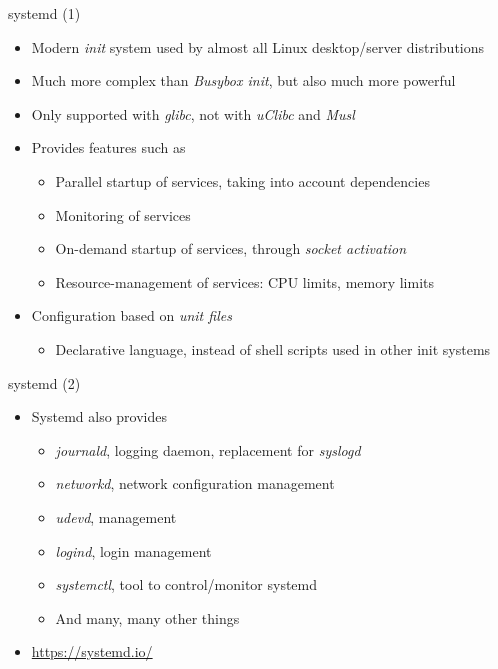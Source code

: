 \begin{frame}{systemd (1)}
  \begin{itemize}
  \item Modern {\em init} system used by almost all Linux
    desktop/server distributions
  \item Much more complex than {\em Busybox init}, but also much more
    powerful
  \item Only supported with {\em glibc}, not with {\em uClibc} and {\em Musl}
  \item Provides features such as
    \begin{itemize}
    \item Parallel startup of services, taking into account
      dependencies
    \item Monitoring of services
    \item On-demand startup of services, through {\em socket
        activation}
    \item Resource-management of services: CPU limits, memory limits
    \end{itemize}
  \item Configuration based on {\em unit files}
    \begin{itemize}
    \item Declarative language, instead of shell scripts used in other
      init systems
    \end{itemize}
  \end{itemize}
\end{frame}

\begin{frame}{systemd (2)}
  \begin{itemize}
  \item Systemd also provides
    \begin{itemize}
    \item {\em journald}, logging daemon, replacement for {\em syslogd}
    \item {\em networkd}, network configuration management
    \item {\em udevd},  management
    \item {\em logind}, login management
    \item {\em systemctl}, tool to control/monitor systemd
    \item And many, many other things
    \end{itemize}
  \item \url{https://systemd.io/}
  \end{itemize}
\end{frame}

